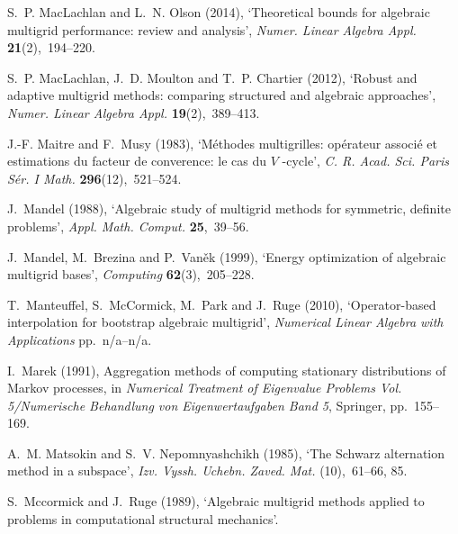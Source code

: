 \documentclass[12pt]{acta_2011xz}
\begin{document}
\begin{thebibliography}{xx}
S.~P. MacLachlan and L.~N. Olson  (2014), `Theoretical bounds for algebraic
  multigrid performance: review and analysis', {\em Numer. Linear Algebra
  Appl.} {\bf 21}(2),~194--220.

S.~P. MacLachlan, J.~D. Moulton and T.~P. Chartier  (2012), `Robust and
  adaptive multigrid methods: comparing structured and algebraic approaches',
  {\em Numer. Linear Algebra Appl.} {\bf 19}(2),~389--413.

J.-F. Maitre and F.~Musy  (1983), `M\'{e}thodes multigrilles: op\'{e}rateur
  associ\'{e} et estimations du facteur de converence: le cas du {        $V$        }-cycle',
  {\em C. R. Acad. Sci. Paris S\'{e}r. I Math.} {\bf 296}(12),~521--524.

J.~Mandel  (1988), `Algebraic study of multigrid methods for symmetric,
  definite problems', {\em Appl. Math. Comput.} {\bf 25},~39--56.

J.~Mandel, M.~Brezina and P.~Van{\v{e}}k  (1999), `Energy optimization of
  algebraic multigrid bases', {\em Computing} {\bf 62}(3),~205--228.

T.~Manteuffel, S.~McCormick, M.~Park and J.~Ruge  (2010), `{Operator-based
  interpolation for bootstrap algebraic multigrid}', {\em Numerical Linear
  Algebra with Applications} pp.~n/a--n/a.

I.~Marek  (1991), {Aggregation methods of computing stationary distributions of
  Markov processes}, in {\em Numerical Treatment of Eigenvalue Problems Vol.
  5/Numerische Behandlung von Eigenwertaufgaben Band 5}, Springer,
  pp.~155--169.

A.~M. Matsokin and S.~V. Nepomnyashchikh  (1985), `The {S}chwarz alternation
  method in a subspace', {\em Izv. Vyssh. Uchebn. Zaved. Mat.} (10),~61--66,
  85.

S.~Mccormick and J.~Ruge  (1989), `Algebraic multigrid methods applied to
  problems in computational structural mechanics'.


\end{thebibliography}
\end{document}
